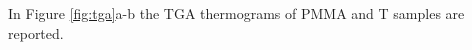 \documentclass[a4paper, 11pt]{article}
\begin{document}
In Figure \ref{fig:tga}a-b the TGA thermograms of PMMA and T samples are reported. 
\begin{figure}[htp]
\centering
{} \quad 
\subfloat[][]

\end{figure}
\end{document}
